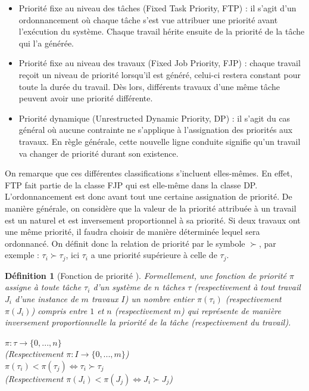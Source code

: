 \documentclass[12pt,a4paper,oneside]{book}
\theoremstyle{break}
\newtheorem{defin}{Définition}[chapter]
\theoremstyle{breakplain}
\begin{document}
\begin{itemize}
\item Priorité fixe au niveau des tâches (Fixed Task Priority, FTP) : il s'agit d'un ordonnancement où chaque tâche s'est vue attribuer une priorité avant l'exécution du système. Chaque travail hérite ensuite de la priorité de la tâche qui l'a générée.
\item Priorité fixe au niveau des travaux (Fixed Job Priority, FJP) : chaque travail reçoit un niveau de priorité lorsqu'il est généré, celui-ci restera constant pour toute la durée du travail. Dès lors, différents travaux d'une même tâche peuvent avoir une priorité différente.
\item Priorité dynamique (Unrestructed Dynamic Priority, DP) : il s'agit du cas général où aucune contrainte ne s'applique à l'assignation des priorités aux travaux. En règle générale, cette nouvelle ligne conduite signifie qu'un travail va changer de priorité durant son existence.\\
\end{itemize}
On remarque que ces différentes classifications s'incluent elles-mêmes. En effet, FTP fait partie de la classe FJP qui est elle-même dans la classe DP.\\

L'ordonnancement est donc avant tout une certaine assignation de priorité. De manière générale, on considère que la valeur de la priorité attribuée à un travail est un naturel et est inversement proportionnel à sa priorité. Si deux travaux ont une même priorité, il faudra choisir de manière déterminée lequel sera ordonnancé. On définit donc la relation de priorité par le symbole $\succ$, par exemple : $\tau_i \succ \tau_j$, ici $\tau_i$ a une priorité supérieure à celle de $\tau_j$.\\

\pagebreak

\begin{defin}[Fonction de priorité \cite{santy2012ordonnancement}]
Formellement, une fonction de priorité $\pi$ assigne à toute tâche $\tau_i$ d'un système de $n$ tâches $\tau$ (respectivement à tout travail $J_i$ d'une instance de $m$ travaux $I$) un nombre entier $\pi(\tau_i)$ (respectivement $\pi(J_i)$) compris entre $1$ et $n$ (respectivement $m$) qui représente de manière inversement proportionnelle la priorité de la tâche (respectivement du travail).
\begin{center}
$\pi : \tau \rightarrow \{0,...,n \}$\\
(Respectivement $\pi : I \rightarrow \{0,...,m \}$)\\
$\pi(\tau_i) < \pi(\tau_j) \Leftrightarrow \tau_i \succ \tau_j$\\
(Respectivement $\pi(J_i) < \pi(J_j) \Leftrightarrow J_i \succ J_j$)
\end{center}
\end{defin}
\end{document}
